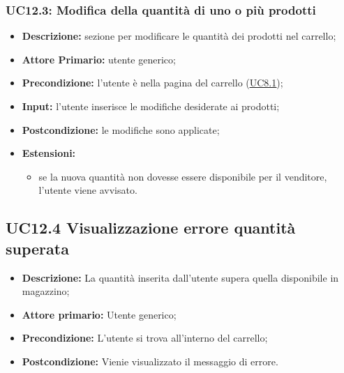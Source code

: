         \subsubsection{UC12.3: Modifica della quantità di uno o più prodotti}
        \begin{itemize}
            \item \textbf{Descrizione:} sezione per modificare le quantità dei prodotti nel carrello;
            \item \textbf{Attore Primario:} utente generico;
            \item \textbf{Precondizione:} l'utente è nella pagina del carrello (\hyperref[sec:UC8.1]{\underline{UC8.1}});
            \item \textbf{Input:} l'utente inserisce le modifiche desiderate ai prodotti;
            \item \textbf{Postcondizione:} le modifiche sono applicate;
            \item \textbf{Estensioni:} 
                \begin{itemize}
                    \item se la nuova quantità non dovesse essere disponibile per il venditore, l'utente viene avvisato.
                \end{itemize}
        \end{itemize}
        \subsection{UC12.4 Visualizzazione errore quantità superata}
        \begin{itemize}
            \item \textbf{Descrizione:} La quantità inserita dall'utente supera quella disponibile in magazzino;
            \item \textbf{Attore primario:} Utente generico;
            \item \textbf{Precondizione:} L'utente si trova all'interno del carrello;
            \item \textbf{Postcondizione:} Vienie visualizzato il messaggio di errore.
        \end{itemize}